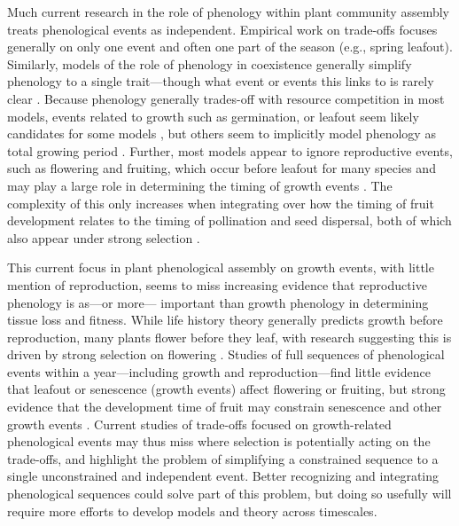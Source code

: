 \documentclass[11pt]{article}
\begin{document}
Much current research in the role of phenology within plant community assembly treats phenological events as independent. Empirical work on trade-offs focuses generally on only one event and often one part of the season (e.g., spring leafout). Similarly, models of the role of phenology in coexistence generally simplify phenology to a single trait---though what event or events this links to is rarely clear \citep[even when studied with empirical data][]{godoy2014}. Because phenology generally trades-off with resource competition in most models, events related to growth such as germination, or leafout seem likely candidates for some models \citep[e.g.,][]{godoy2014,wolkovich2021phenological}, but others seem to implicitly model phenology as total growing period \citep{levine2022competition}. Further, most models appear to ignore reproductive events, such as flowering and fruiting, which occur before leafout for many species \citep{Primack:1987jz,dan2021nph} and may play a large role in determining the timing of growth events \citep{ettinger2018phenological}. The complexity of this only increases when integrating over how the timing of fruit development relates to the timing of pollination and seed dispersal, both of which also appear under strong selection \citep{whitehead1969wind}.

This current focus in plant phenological assembly on growth events, with little mention of reproduction, seems to miss increasing evidence that reproductive phenology is as---or more--- important than growth phenology in determining tissue loss and fitness. While life history theory generally predicts growth before reproduction, many plants flower before they leaf, with research suggesting this is driven by strong selection on flowering \citep{dan2021nph}. Studies of full sequences of phenological events within a year---including growth and reproduction---find little evidence that leafout or senescence (growth events) affect flowering or fruiting, but strong evidence that the development time of fruit may constrain senescence and other growth events \citep{ettinger2018phenological}. Current studies of trade-offs focused on growth-related phenological events may thus miss where selection is potentially acting on the trade-offs, and highlight the problem of simplifying a constrained sequence to a single unconstrained and independent event. Better recognizing and integrating phenological sequences could solve part of this problem, but doing so usefully will require more efforts to develop models and theory across timescales. 
\end{document}
